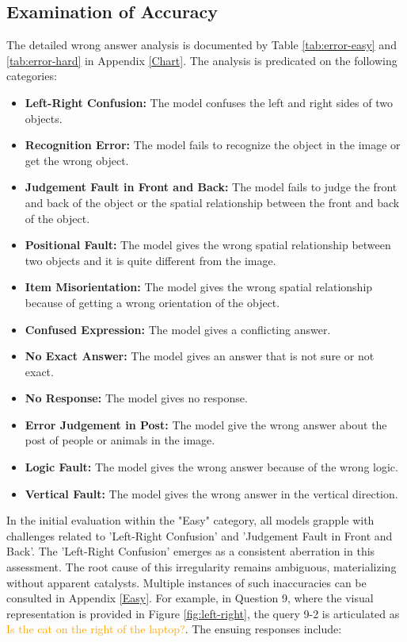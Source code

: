 \documentclass[journal,10pt]{IEEEtran}
\begin{document}
\subsection{Examination of Accuracy}
The detailed wrong answer analysis is documented by Table \ref{tab:error-easy} and \ref{tab:error-hard} in Appendix \ref{Chart}. The analysis is predicated on the following categories:
\begin{itemize}
    \item \textbf{Left-Right Confusion:} The model confuses the left and right sides of two objects.
    \item \textbf{Recognition Error:} The model fails to recognize the object in the image or get the wrong object.
    \item \textbf{Judgement Fault in Front and Back:} The model fails to judge the front and back of the object or the spatial relationship between the front and back of the object.
    \item \textbf{Positional Fault:} The model gives the wrong spatial relationship between two objects and it is quite different from the image.
    \item \textbf{Item Misorientation:} The model gives the wrong spatial relationship because of getting a wrong orientation of the object.
    \item \textbf{Confused Expression:} The model gives a conflicting answer.
    \item \textbf{No Exact Answer:} The model gives an answer that is not sure or not exact.
    \item \textbf{No Response:} The model gives no response.
    \item \textbf{Error Judgement in Post:} The model give the wrong answer about the post of people or animals in the image.
    \item \textbf{Logic Fault:} The model gives the wrong answer because of the wrong logic.
    \item \textbf{Vertical Fault:} The model gives the wrong answer in the vertical direction.
\end{itemize}

In the initial evaluation within the "Easy" category, all models grapple with challenges related to 'Left-Right Confusion' and 'Judgement Fault in Front and Back'. The 'Left-Right Confusion' emerges as a consistent aberration in this assessment. The root cause of this irregularity remains ambiguous, materializing without apparent catalysts. Multiple instances of such inaccuracies can be consulted in Appendix \ref{Easy}. For example, in Question 9, where the visual representation is provided in Figure \ref{fig:left-right}, the query 9-2 is articulated as \textcolor{orange}{Is the cat on the right of the laptop?}. The ensuing responses include: 
\end{document}
